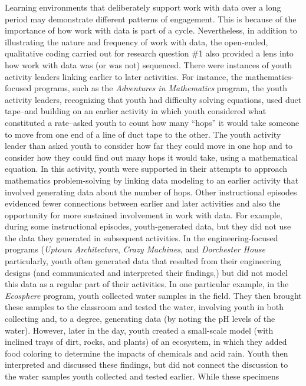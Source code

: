 \documentclass[]{msu-thesis}
\theoremstyle{definition}
\theoremstyle{definition}
\theoremstyle{definition}
\theoremstyle{remark}
\begin{document}
Learning environments that deliberately support work with data over a
long period may demonstrate different patterns of engagement. This is
because of the importance of how work with data is part of a cycle.
Nevertheless, in addition to illustrating the nature and frequency of
work with data, the open-ended, qualitative coding carried out for
research question \#1 also provided a lens into how work with data was
(or was not) sequenced. There were instances of youth activity leaders
linking earlier to later activities. For instance, the
mathematics-focused programs, such as the \emph{Adventures in
Mathematics} program, the youth activity leaders, recognizing that youth
had difficulty solving equations, used duct tape--and building on an
earlier activity in which youth considered what constituted a
rate--asked youth to count how many ``hops'' it would take someone to
move from one end of a line of duct tape to the other. The youth
activity leader than asked youth to consider how far they could move in
one hop and to consider how they could find out many hops it would take,
using a mathematical equation. In this activity, youth were supported in
their attempts to approach mathematics problem-solving by linking data
modeling to an earlier activity that involved generating data about the
number of hops. Other instructional episodes evidenced fewer connections
between earlier and later activities and also the opportunity for more
sustained involvement in work with data. For example, during some
instructional episodes, youth-generated data, but they did not use the
data they generated in subsequent activities. In the engineering-focused
programs (\emph{Uptown Architecture}, \emph{Crazy Machines}, and
\emph{Dorchester House} particularly, youth often generated data that
resulted from their engineering designs (and communicated and
interpreted their findings,) but did not model this data as a regular
part of their activities. In one particular example, in the
\emph{Ecosphere} program, youth collected water samples in the field.
They then brought these samples to the classroom and tested the water,
involving youth in both collecting and, to a degree, generating data (by
noting the pH levels of the water). However, later in the day, youth
created a small-scale model (with inclined trays of dirt, rocks, and
plants) of an ecosystem, in which they added food coloring to determine
the impacts of chemicals and acid rain. Youth then interpreted and
discussed these findings, but did not connect the discussion to the
water samples youth collected and tested earlier. While these specimens
\end{document}
